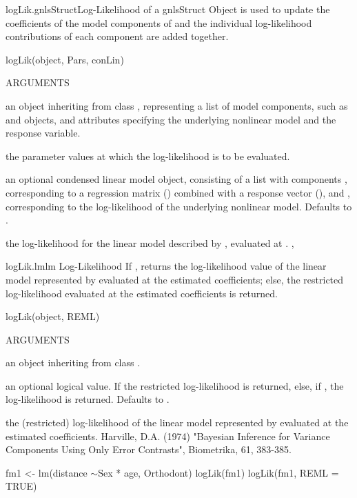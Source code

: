\documentclass[pdftex]{article} \usepackage{url,graphicx}
\renewcommand{\Twiddle}{\mbox{\(\sim\)}}
\begin{document}
\begin{Helpfile}{logLik.gnlsStruct}{Log-Likelihood of a gnlsStruct Object}
 is used to update the coefficients of the model components
of  and the individual log-likelihood
contributions of each component are added together.
\begin{Example}
logLik(object, Pars, conLin)
\end{Example}
\begin{Argument}{ARGUMENTS}
\item[\Co{object:}]
an object inheriting from class ,
representing a list of model components, such as
 and  objects, and attributes
specifying the underlying nonlinear model and the response variable.
\item[\Co{Pars:}]
the parameter values at which the log-likelihood is to be
evaluated.
\item[\Co{conLin:}]
an optional condensed linear model object, consisting of
a list with components , corresponding to a regression
matrix () combined with a response vector (), and 
, corresponding to the log-likelihood of the
underlying nonlinear model. Defaults to .
\end{Argument}
the log-likelihood for the linear model described by ,
evaluated at .
, 
\end{Helpfile}
\begin{Helpfile}{logLik.lm}{lm Log-Likelihood}
If , returns the log-likelihood value of the linear
model represented by  evaluated at the estimated
coefficients; else, the restricted log-likelihood evaluated at the
estimated coefficients is returned.
\begin{Example}
logLik(object, REML)
\end{Example}
\begin{Argument}{ARGUMENTS}
\item[\Co{object:}]
an object inheriting from class .
\item[\Co{REML:}]
an optional logical value. If  the restricted
log-likelihood is returned, else, if , the log-likelihood
is returned. Defaults to .
\end{Argument}
the (restricted) log-likelihood of the linear model represented by
 evaluated at the estimated coefficients.
Harville, D.A. (1974) "Bayesian Inference for Variance Components
Using Only Error Contrasts", Biometrika, 61, 383-385.
\need 15pt
\vspace{-16pt} 
\begin{Example}
fm1 <- lm(distance \Twiddle Sex * age, Orthodont)
logLik(fm1)
logLik(fm1, REML = TRUE)
\end{Example}
\end{Helpfile}
\end{document}
